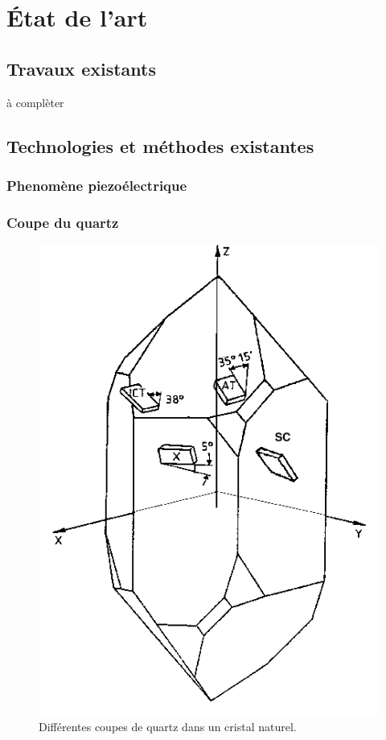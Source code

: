 \chapter{État de l'art}


\section{Travaux existants}
à complèter

\section{Technologies et méthodes existantes}
\subsection{Phenomène piezoélectrique}


\subsection{Coupe du quartz}

\begin{figure}[H]
    \centering
    \includegraphics[width=\textwidth]{assets/figures/Orientation-of-different-cuts-in-a-natural-quartz-crystal.png}
    \caption{Différentes coupes de quartz dans un cristal naturel.}
    \label{fig:calibration plot}
\end{figure}

